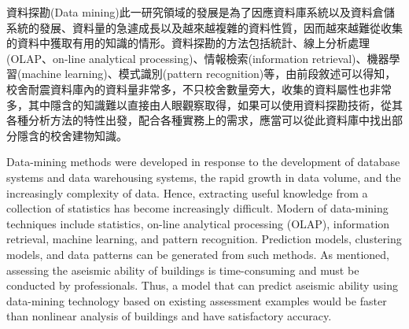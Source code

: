 資料探勘(Data mining)此一研究領域的發展是為了因應資料庫系統以及資料倉儲系統的發展、資料量的急遽成長以及越來越複雜的資料性質，因而越來越難從收集的資料中獲取有用的知識的情形。資料探勘的方法包括統計、線上分析處理(OLAP、on-line analytical processing)、情報檢索(information retrieval)、機器學習(machine learning)、模式識別(pattern recognition)等，由前段敘述可以得知，校舍耐震資料庫內的資料量非常多，不只校舍數量旁大，收集的資料屬性也非常多，其中隱含的知識難以直接由人眼觀察取得，如果可以使用資料探勘技術，從其各種分析方法的特性出發，配合各種實務上的需求，應當可以從此資料庫中找出部分隱含的校舍建物知識。


Data-mining methods were developed in response to the development of database systems and data warehousing systems, the rapid growth in data volume, and the increasingly complexity of data. Hence, extracting useful knowledge from a collection of statistics has become increasingly difficult. Modern of data-mining techniques include statistics, on-line analytical processing (OLAP), information retrieval, machine learning, and pattern recognition. Prediction models, clustering models, and data patterns can be generated from such methods. As mentioned, assessing the aseismic ability of buildings is time-consuming and must be conducted by professionals. Thus, a model that can predict aseismic ability using data-mining technology based on existing assessment examples would be faster than nonlinear analysis of buildings and have satisfactory accuracy.

